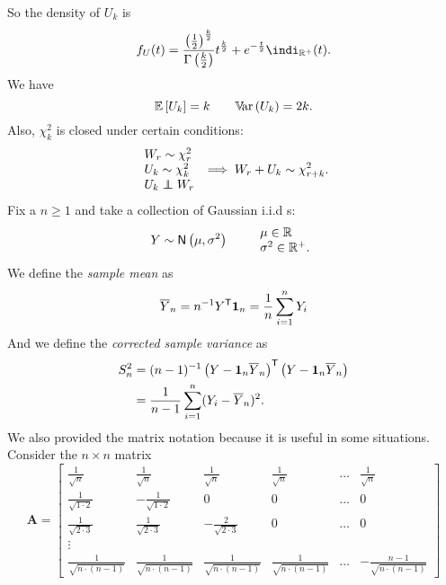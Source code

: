 \documentclass[12pt]{report}
\begin{document}
So the density of $U_{k}$ is
\begin{equation*}
	f_{U}(t)=\frac{\left(\unmezz\right)^{\frac{k}{2}}}{\Gamma\left(\frac{k}{2}\right)}t^{\frac{k}{2}}+e^{-\frac{t}{2}}\indi_{\R^{+}}(t).
\end{equation*}
We have
\begin{equation*}
	\mathbb{E}\left[U_{k}\right]=k\qquad\mathbb{V}\!\mathrm{ar}\,(U_{k})=2k.
\end{equation*}
Also, $\chi^{2}_{k}$ is closed under certain conditions:
\begin{equation*}
	\begin{array}{l}
		W_{r}\sim\chi^{2}_{r}\\
		U_{k}\sim\chi^{2}_k\\
		U_{k}\indep W_{r}
	\end{array}\implies W_{r}+U_{k}\sim\chi^{2}_{r+k}.
\end{equation*}
Fix a $n\geq1$ and take a collection of Gaussian i.i.d \rv s:
\begin{equation*}
	Y\sim\mathsf{N}\left(\mu,\sigma^{2}\right)\qquad\begin{array}{l}
		\mu\in\mathbb{R}\\
		\sigma^{2}\in\mathbb{R}^{+}.
	\end{array}
\end{equation*}
We define the \emph{sample mean} as
\begin{equation*}
	\overline{Y}_{n}=n^{-1}Y^{\mathsf{T}}\mathbf{1}_{n}=\frac{1}{n}\sum_{i=1}^{n}Y_{i}
\end{equation*}
And we define the \emph{corrected sample variance} as
\begin{align*}
	S^{2}_{n}&=(n-1)^{-1}\left(Y-\mathbf{1}_{n}\overline{Y}_{n}\right)^{\mathsf{T}}\left(Y-\mathbf{1}_{n}\overline{Y}_{n}\right)\\
	&=\frac{1}{n-1}\sum_{i=1}^{n}(Y_{i}-\overline{Y}_{n})^{2}.
\end{align*}
We also provided the matrix notation because it is useful in some situations. Consider the $n\times n$ matrix
\begin{equation*}
	\mathbf{A}=\begin{bmatrix}
		\frac{1}{\sqrt{n}}&\frac{1}{\sqrt{n}}&\frac{1}{\sqrt{n}}&\frac{1}{\sqrt{n}}&\ldots&\frac{1}{\sqrt{n}}\\
		\frac{1}{\sqrt{1\cdot2}}&-\frac{1}{\sqrt{1\cdot2}}&0&0&\ldots&0\\
		\frac{1}{\sqrt{2\cdot 3}}&\frac{1}{\sqrt{2\cdot 3}}&-\frac{2}{\sqrt{2\cdot 3}}&0&\ldots&0\\
		\vdots\\
		\frac{1}{\sqrt{n\cdot (n-1)}}&	\frac{1}{\sqrt{n\cdot (n-1)}}&	\frac{1}{\sqrt{n\cdot (n-1)}}&	\frac{1}{\sqrt{n\cdot (n-1)}}&\ldots&	-\frac{n-1}{\sqrt{n\cdot (n-1)}}
	\end{bmatrix}
\end{equation*}
\end{document}
